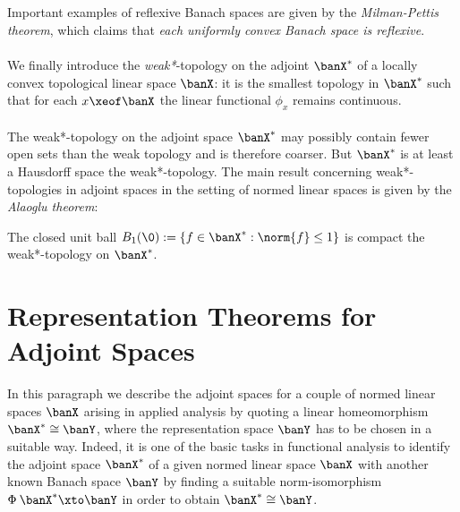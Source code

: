 \documentclass[11pt,twoside]{article}
\begin{document}
\subparagraph{} %
Important examples of reflexive Banach spaces are given
by the \textit{Milman-Pettis} \textit{theorem},
which claims that
\textit{each uniformly convex Banach space is reflexive}.

\paragraph{} %
We finally introduce the \textit{weak*}-topology on the adjoint $\banX^*$
of a locally convex topological linear space $\banX$:
it is the smallest topology in $\banX^*$
such that
for each $x \xeof \banX$ the linear functional $\phi_x$ remains continuous.

\paragraph{} %
The weak*-topology on the adjoint space $\banX^*$ may possibly contain
fewer open sets than the weak topology and is therefore coarser.
But $\banX^*$ is at least a Hausdorff space {\wrt} the weak*-topology.
The main result concerning weak*-topologies in adjoint spaces in the setting
of normed linear spaces is given by the \textit{Alaoglu theorem}:

\begin{theorem1}\label{IV_ALAOGLU_BOURBAKI_THEOREM}
The closed unit ball
$B_1(\0) : = \{ f \in \banX^*: \norm{f} \leq 1 \}$ is compact
{\wrt} the weak*-topology on $\banX^*$.
\end{theorem1}

\section{Representation Theorems for Adjoint Spaces}
In this paragraph we describe the adjoint spaces
for a couple of normed linear spaces $\banX$ arising in applied analysis
by quoting a linear homeomorphism $\banX^* \cong \banY$,
where the representation space $\banY$ has to be chosen in a suitable way.
Indeed,
it is one of the basic tasks in functional analysis to identify
the adjoint space $\banX^*$ of a given normed linear space $\banX$
with another known Banach space $\banY$
by finding a suitable norm-isomorphism $\Phi \: \banX^* \xto \banY$
in order to obtain $\banX^* \cong \banY$.
\end{document}
